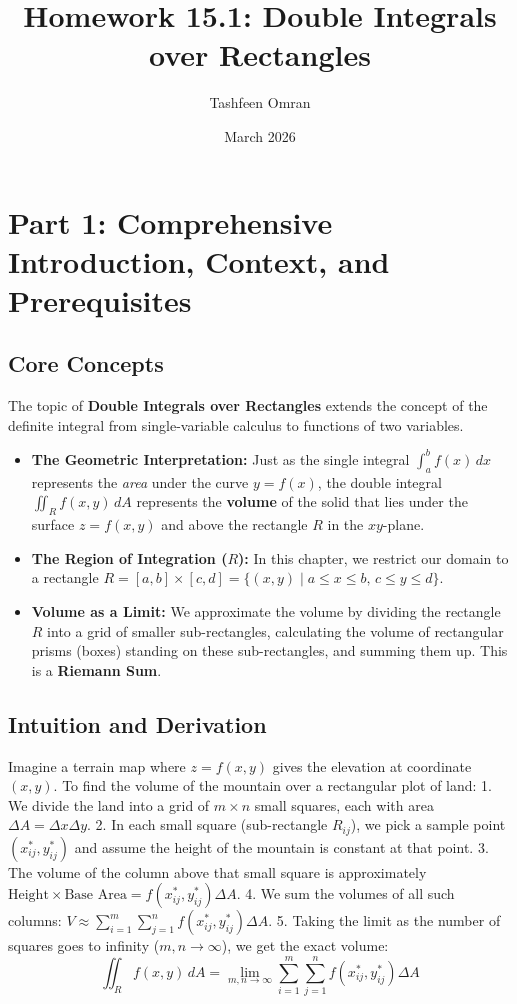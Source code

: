 \documentclass[11pt,a4paper]{article}
\title{\textbf{Homework 15.1: Double Integrals over Rectangles}}
\author{Tashfeen Omran}
\date{March 2026}
\begin{document}
\maketitle
\tableofcontents
\newpage

\section{Part 1: Comprehensive Introduction, Context, and Prerequisites}

\subsection{Core Concepts}
The topic of \textbf{Double Integrals over Rectangles} extends the concept of the definite integral from single-variable calculus to functions of two variables.
\begin{itemize}
    \item \textbf{The Geometric Interpretation:} Just as the single integral $\int_a^b f(x) \, dx$ represents the \textit{area} under the curve $y=f(x)$, the double integral $\iint_R f(x,y) \, dA$ represents the \textbf{volume} of the solid that lies under the surface $z = f(x,y)$ and above the rectangle $R$ in the $xy$-plane.
    \item \textbf{The Region of Integration ($R$):} In this chapter, we restrict our domain to a rectangle $R = [a,b] \times [c,d] = \{(x,y) \mid a \le x \le b, \, c \le y \le d\}$.
    \item \textbf{Volume as a Limit:} We approximate the volume by dividing the rectangle $R$ into a grid of smaller sub-rectangles, calculating the volume of rectangular prisms (boxes) standing on these sub-rectangles, and summing them up. This is a \textbf{Riemann Sum}.
\end{itemize}

\subsection{Intuition and Derivation}
Imagine a terrain map where $z=f(x,y)$ gives the elevation at coordinate $(x,y)$. To find the volume of the mountain over a rectangular plot of land:
1. We divide the land into a grid of $m \times n$ small squares, each with area $\Delta A = \Delta x \Delta y$.
2. In each small square (sub-rectangle $R_{ij}$), we pick a sample point $(x_{ij}^*, y_{ij}^*)$ and assume the height of the mountain is constant at that point.
3. The volume of the column above that small square is approximately $\text{Height} \times \text{Base Area} = f(x_{ij}^*, y_{ij}^*) \Delta A$.
4. We sum the volumes of all such columns: $V \approx \sum_{i=1}^m \sum_{j=1}^n f(x_{ij}^*, y_{ij}^*) \Delta A$.
5. Taking the limit as the number of squares goes to infinity ($m, n \to \infty$), we get the exact volume:
\[ \iint_R f(x,y) \, dA = \lim_{m,n \to \infty} \sum_{i=1}^m \sum_{j=1}^n f(x_{ij}^*, y_{ij}^*) \Delta A \]
\end{document}
